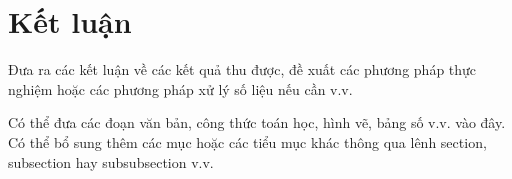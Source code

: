 \chapter{Kết luận}
\label{ch:ketluan}
Đưa ra các kết luận về các kết quả thu được, đề xuất các phương pháp thực nghiệm hoặc các phương pháp xử lý số liệu nếu cần v.v.

Có thể đưa các đoạn văn bản, công thức toán học, hình vẽ, bảng số v.v. vào đây. Có thể bổ sung thêm các mục hoặc các tiểu mục khác thông qua lênh section, subsection hay subsubsection v.v.
